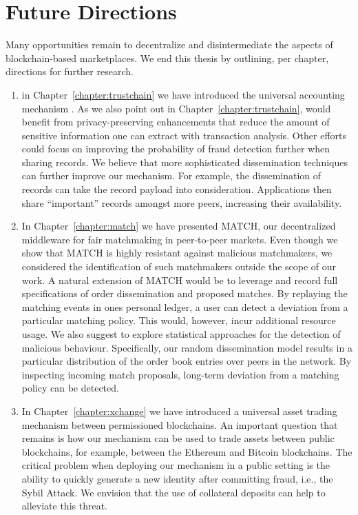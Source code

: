 \section{Future Directions}
Many opportunities remain to decentralize and disintermediate the aspects of blockchain-based marketplaces.
We end this thesis by outlining, per chapter, directions for further research.

\begin{enumerate}
	\item in Chapter~\ref{chapter:trustchain} we have introduced the universal accounting mechanism \TrustChain{}.
	As we also point out in Chapter~\ref{chapter:trustchain}, \TrustChain{} would benefit from privacy-preserving enhancements that reduce the amount of sensitive information one can extract with transaction analysis.
	Other efforts could focus on improving the probability of fraud detection further when sharing records.
	We believe that more sophisticated dissemination techniques can further improve our mechanism.
	For example, the dissemination of records can take the record payload into consideration.
	Applications then share \enquote{important} records amongst more peers, increasing their availability.
	
	\item In Chapter~\ref{chapter:match} we have presented MATCH, our decentralized middleware for fair matchmaking in peer-to-peer markets.
	Even though we show that MATCH is highly resistant against malicious matchmakers, we considered the identification of such matchmakers outside the scope of our work.
	A natural extension of MATCH would be to leverage \TrustChain{} and record full specifications of order dissemination and proposed matches.
	By replaying the matching events in ones personal ledger, a user can detect a deviation from a particular matching policy.
	This would, however, incur additional resource usage.
	We also suggest to explore statistical approaches for the detection of malicious behaviour.
	Specifically, our random dissemination model results in a particular distribution of the order book entries over peers in the network.
	By inspecting incoming match proposals, long-term deviation from a matching policy can be detected.
	
	\item In Chapter~\ref{chapter:xchange} we have introduced a universal asset trading mechanism between permissioned blockchains.
	An important question that remains is how our mechanism can be used to trade assets between public blockchains, for example, between the Ethereum and Bitcoin blockchains.
	The critical problem when deploying our mechanism in a public setting is the ability to quickly generate a new identity after committing fraud, i.e., the Sybil Attack.
	We envision that the use of collateral deposits can help to alleviate this threat.
	

\end{enumerate}
